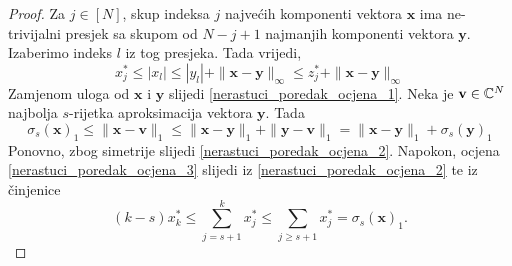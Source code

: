 \documentclass[a4paper,twoside,12pt]{memoir} %
\newcommand{\vect}[1]{\mathbf{#1}}
\newcommand{\norm}[1]{\|{#1}\|}
\begin{document}
\begin{proof}
    Za $j \in [N]$, skup indeksa $j$ najve\'cih komponenti vektora $\vect{x}$ ima ne-trivijalni presjek sa skupom od $N-j+1$ najmanjih komponenti vektora $\vect{y}$. Izaberimo indeks $l$ iz tog presjeka. Tada vrijedi, 
    \begin{equation*}
        x_j^* \leq |x_l| \leq |y_l| + \norm{\vect{x} - \vect{y}}_{\infty} \leq z_j^* + \norm{\vect{x} - \vect{y}}_{\infty}
    \end{equation*}
    Zamjenom uloga od $\vect{x}$ i $\vect{y}$ slijedi \eqref{nerastuci_poredak_ocjena_1}.
    Neka je $\vect{v} \in \C^N$ najbolja $s$-rijetka aproksimacija vektora $\vect{y}$. Tada
    \begin{equation*}
        \sigma_s(\vect{x})_1 \leq \norm{\vect{x} - \vect{v}}_1 \leq \norm{\vect{x} - \vect{y}}_1 + \norm{\vect{y} - \vect{v}}_1 = \norm{\vect{x} - \vect{y}}_1 + \sigma_s(\vect{y})_1 
    \end{equation*}
    Ponovno, zbog simetrije slijedi \eqref{nerastuci_poredak_ocjena_2}. Napokon, ocjena \eqref{nerastuci_poredak_ocjena_3} slijedi iz \eqref{nerastuci_poredak_ocjena_2} te iz \v{c}injenice
    \begin{equation*}
        (k-s)x_k^* \leq \sum_{j=s+1}^{k}x_j^* \leq \sum_{j \geq s+1} x_j^* = \sigma_s(\vect{x})_1.
    \end{equation*}
\end{proof}
\end{document}
